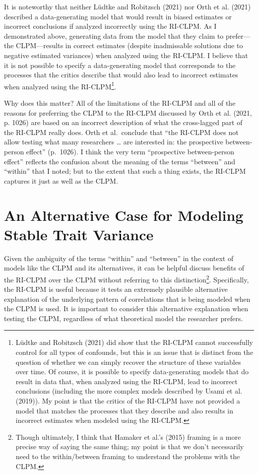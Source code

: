\documentclass[
  english,
  man,floatsintext]{apa6}
\begin{document}
It is noteworthy that neither Lüdtke and Robitzsch (2021) nor Orth et al. (2021) described a data-generating model that would result in biased estimates or incorrect conclusions if analyzed incorrectly using the RI-CLPM. As I demonstrated above, generating data from the model that they claim to prefer---the CLPM---results in correct estimates (despite inadmissable solutions due to negative estimated variances) when analyzed using the RI-CLPM. I believe that it is not possible to specify a data-generating model that corresponds to the processes that the critics describe that would also lead to incorrect estimates when analyzed using the RI-CLPM\footnote{Lüdtke and Robitzsch (2021) did show that the RI-CLPM cannot successfully control for all types of confounds, but this is an issue that is distinct from the question of whether we can simply recover the structure of these variables over time. Of course, it is possible to specify data-generating models that do result in data that, when analyzed using the RI-CLPM, lead to incorrect conclusions (including the more complex models described by Usami et al. (2019)). My point is that the critics of the RI-CLPM have not provided a model that matches the processes that they describe and also results in incorrect estimates when modeled using the RI-CLPM.}.

Why does this matter? All of the limitations of the RI-CLPM and all of the reasons for preferring the CLPM to the RI-CLPM discussed by Orth et al. (2021, p. 1026) are based on an incorrect description of what the cross-lagged part of the RI-CLPM really does. Orth et al.~conclude that ``the RI-CLPM does not allow testing what many researchers \ldots{} are interested in: the prospective between-person effect'' (p.~1026). I think the very term ``prospective between-person effect'' reflects the confusion about the meaning of the terms ``between'' and ``within'' that I noted; but to the extent that such a thing exists, the RI-CLPM captures it just as well as the CLPM.

\hypertarget{an-alternative-case-for-modeling-stable-trait-variance}{%
\section{An Alternative Case for Modeling Stable Trait Variance}\label{an-alternative-case-for-modeling-stable-trait-variance}}

Given the ambiguity of the terms ``within'' and ``between'' in the context of models like the CLPM and its alternatives, it can be helpful discuss benefits of the RI-CLPM over the CLPM without referring to this distinction\footnote{Though ultimately, I think that Hamaker et al.'s (2015) framing is a more precise way of saying the same thing; my point is that we don't necessarily need to the within/between framing to understand the problems with the CLPM.}. Specifically, the RI-CLPM is useful because it tests an extremely plausible alternative explanation of the underlying pattern of correlations that is being modeled when the CLPM is used. It is important to consider this alternative explanation when testing the CLPM, regardless of what theoretical model the researcher prefers.
\end{document}
